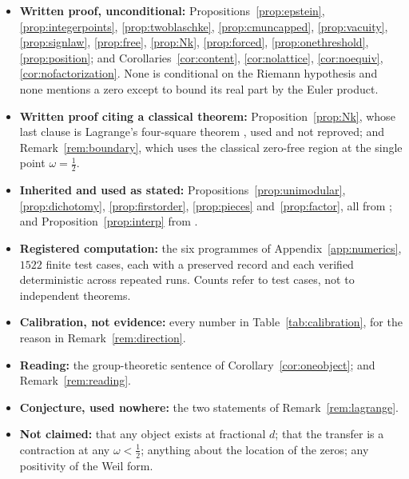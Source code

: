 \begin{itemize}
\item \textbf{Written proof, unconditional:}
 Propositions~\ref{prop:epstein}, \ref{prop:integerpoints},
 \ref{prop:twoblaschke}, \ref{prop:cmuncapped}, \ref{prop:vacuity},
 \ref{prop:signlaw}, \ref{prop:free}, \ref{prop:Nk}, \ref{prop:forced},
 \ref{prop:onethreshold}, \ref{prop:position}; and
 Corollaries~\ref{cor:content}, \ref{cor:nolattice}, \ref{cor:noequiv},
 \ref{cor:nofactorization}. None is conditional on the Riemann hypothesis and
 none mentions a zero except to bound its real part by the Euler product.
\item \textbf{Written proof citing a classical theorem:}
 Proposition~\ref{prop:Nk}, whose last clause is Lagrange's four-square theorem
 \cite{HardyWright}, used and not reproved; and Remark~\ref{rem:boundary}, which
 uses the classical zero-free region \cite{Titchmarsh} at the single point
 $\omega=\frac12$.
\item \textbf{Inherited and used as stated:}
 Propositions~\ref{prop:unimodular}, \ref{prop:dichotomy},
 \ref{prop:firstorder}, \ref{prop:pieces} and~\ref{prop:factor}, all from
 \cite{Markov}; and Proposition~\ref{prop:interp} from \cite{RankNote}.
\item \textbf{Registered computation:} the six programmes of
 Appendix~\ref{app:numerics}, $1522$ finite test cases, each with a preserved
 record and each verified deterministic across repeated runs. Counts refer to
 test cases, not to independent theorems.
\item \textbf{Calibration, not evidence:} every number in
 Table~\ref{tab:calibration}, for the reason in Remark~\ref{rem:direction}.
\item \textbf{Reading:} the group-theoretic sentence of
 Corollary~\ref{cor:oneobject}; and Remark~\ref{rem:reading}.
\item \textbf{Conjecture, used nowhere:} the two statements of
 Remark~\ref{rem:lagrange}.
\item \textbf{Not claimed:} that any object exists at fractional $d$; that the
 transfer is a contraction at any $\omega<\frac12$; anything about the location
 of the zeros; any positivity of the Weil form.
\end{itemize}
